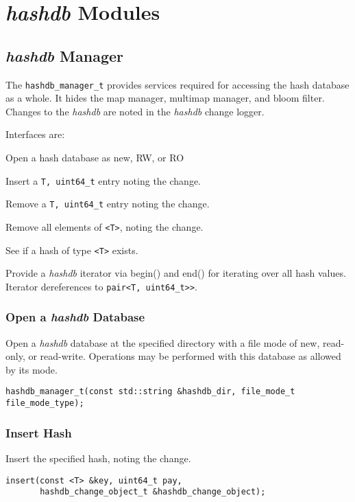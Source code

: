 \documentclass[12pt,twoside]{article}
\newcommand{\hdb}{\emph{hashdb}\xspace}
\begin{document}
\section{\hdb Modules}
\subsection{\hdb Manager}
The \texttt{hashdb\_manager\_t}
provides services required for accessing the hash database
as a whole.  It hides the map manager, multimap manager, and bloom filter.
Changes to the \hdb are noted in the \hdb change logger.

Interfaces are:
\begin{compactitem}
\item Open a hash database as new, RW, or RO
\item Insert a \texttt{T, uint64\_t} entry noting the change.
\item Remove a \texttt{T, uint64\_t} entry noting the change.
\item Remove all elements of \texttt{<T>}, noting the change.
\item See if a hash of type \texttt{<T>} exists.
\item Provide a \hdb iterator via begin() and end()
for iterating over all hash values.
Iterator dereferences to \texttt{pair<T, uint64\_t>>}.
\end{compactitem}

\subsubsection{Open a \hdb Database}
Open a \hdb database at the specified directory
with a file mode of new, read-only, or read-write.
Operations may be performed with this database as allowed by its mode.

\begin{small}
\begin{verbatim}
hashdb_manager_t(const std::string &hashdb_dir, file_mode_t file_mode_type);
\end{verbatim}
\end{small}

\subsubsection{Insert Hash}
Insert the specified hash, noting the change.

\begin{small}
\begin{verbatim}
insert(const <T> &key, uint64_t pay,
       hashdb_change_object_t &hashdb_change_object);
\end{verbatim}
\end{small}
\end{document}
